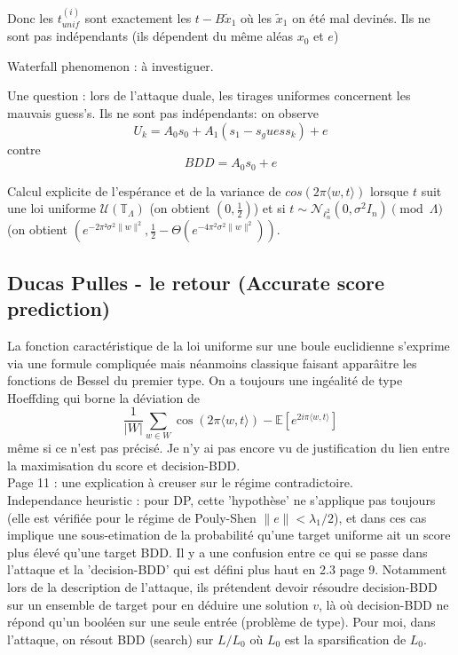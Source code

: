 \documentclass{article}
\begin{document}
Donc les $t^{(i)}_{unif} $ sont exactement les $t-B\tilde x_1$ où les $\tilde x_1$ on été mal devinés. Ils ne sont pas indépendants (ils dépendent du même aléas $x_0$ et $e$)  

Waterfall phenomenon : à investiguer. 

Une question : lors de l'attaque duale, les tirages uniformes concernent les mauvais guess's. Ils ne sont pas indépendants: on observe
$$ U_k = A_0 s_0 + A_1 (s_1 - s_guess_k) + e $$
contre 
$$ BDD = A_0 s_0 + e $$

Calcul explicite de l'espérance et de la variance de $ cos( 2\pi \langle w , t\rangle )$ lorsque $t$ suit une loi uniforme $\mathcal U(\mathbb T_\Lambda)$ (on obtient $(0,\frac{1}{2})$) et si $t\sim \mathcal N_{\ell^2_n}(0 , \sigma^2 I_n) \pmod{\Lambda}$ (on obtient $(e^{-2\pi² \sigma^2 \|w\|^2} , \frac{1}{2} - \Theta(e^{-4\pi^2\sigma^2 \|w\|^2}))$.

\subsection{Ducas Pulles - le retour (Accurate score prediction)}

La fonction caractéristique de la loi uniforme sur une boule euclidienne s'exprime via une formule compliquée mais néanmoins classique faisant apparâitre les fonctions de Bessel du premier type. On a toujours une ingéalité de type Hoeffding qui borne la déviation de 
\[\frac{1}{|W|}\sum_{w\in W}\cos (2\pi\langle w, t \rangle) - \mathbb E[e^{2i\pi \langle w, t \rangle }]\]
même si ce n'est pas précisé. Je n'y ai pas encore vu de justification du lien entre la maximisation du score et decision-BDD.\\

Page 11 : une explication à creuser sur le régime contradictoire.\\

Independance heuristic : pour DP, cette 'hypothèse' ne s'applique pas toujours (elle est vérifiée pour le régime de Pouly-Shen $ \|e\|< \lambda_1 / 2$), et dans ces cas implique une sous-etimation de la probabilité qu'une target uniforme ait un score plus élevé qu'une target BDD. Il y a une confusion entre ce qui se passe dans l'attaque et la 'decision-BDD' qui est défini plus haut en 2.3 page 9. Notamment lors de la description de l'attaque, ils prétendent devoir résoudre decision-BDD sur un ensemble de target pour en déduire une solution $v$, là où decision-BDD ne répond qu'un booléen sur une seule entrée (problème de type). Pour moi, dans l'attaque, on résout BDD (search) sur $L/L_0$ où $L_0$ est la sparsification de $L_0$. 	 \\
\end{document}
